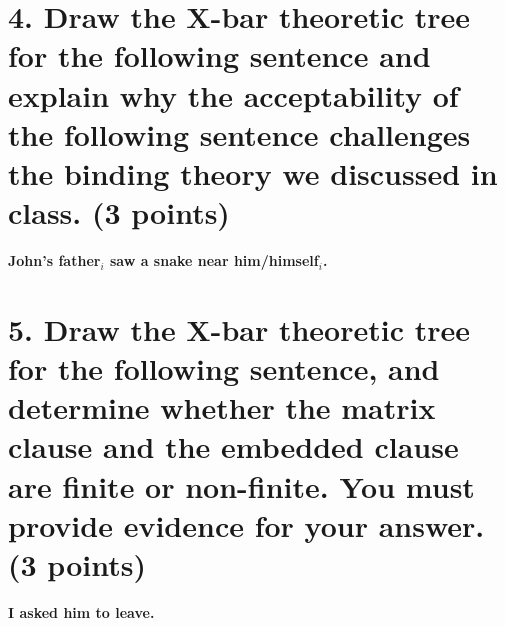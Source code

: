 \documentclass{article}
\begin{document}
\section{4. Draw the X-bar theoretic tree for the following sentence and explain why the acceptability of the following sentence challenges the binding theory we discussed in class. \normalsize{(3 points)}}
\medskip
\begin{center}
     \textbf{John's father$_i$ saw a snake near him/himself$_i$.}
\end{center}

\newpage
\section{5. Draw the X-bar theoretic tree for the following sentence, and determine whether the matrix clause and the embedded clause are finite or non-finite. You must provide evidence for your answer. \normalsize{(3 points)}}
\medskip
\begin{center} 
    \textbf{I asked him to leave.}
\end{center}
\end{document}
